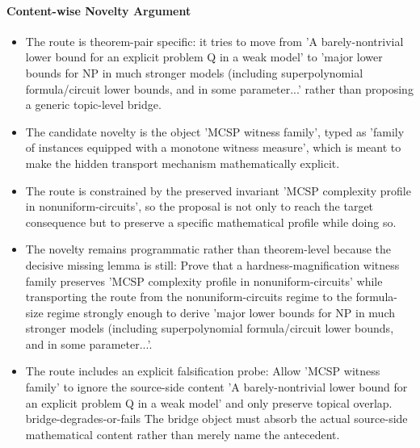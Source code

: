\documentclass[11pt]{article}
\begin{document}
\paragraph{Content-wise Novelty Argument}
\begin{itemize}[leftmargin=*,itemsep=0.2em]
\item The route is theorem-pair specific: it tries to move from 'A barely-nontrivial lower bound for an explicit problem Q in a weak model' to 'major lower bounds for NP in much stronger models (including superpolynomial formula/circuit lower bounds, and in some parameter...' rather than proposing a generic topic-level bridge.
\item The candidate novelty is the object 'MCSP witness family', typed as 'family of instances equipped with a monotone witness measure', which is meant to make the hidden transport mechanism mathematically explicit.
\item The route is constrained by the preserved invariant 'MCSP complexity profile in nonuniform-circuits', so the proposal is not only to reach the target consequence but to preserve a specific mathematical profile while doing so.
\item The novelty remains programmatic rather than theorem-level because the decisive missing lemma is still: Prove that a hardness-magnification witness family preserves 'MCSP complexity profile in nonuniform-circuits' while transporting the route from the nonuniform-circuits regime to the formula-size regime strongly enough to derive 'major lower bounds for NP in much stronger models (including superpolynomial formula/circuit lower bounds, and in some parameter...'.
\item The route includes an explicit falsification probe: Allow 'MCSP witness family' to ignore the source-side content 'A barely-nontrivial lower bound for an explicit problem Q in a weak model' and only preserve topical overlap. bridge-degrades-or-fails The bridge object must absorb the actual source-side mathematical content rather than merely name the antecedent.
\end{itemize}
\end{document}
